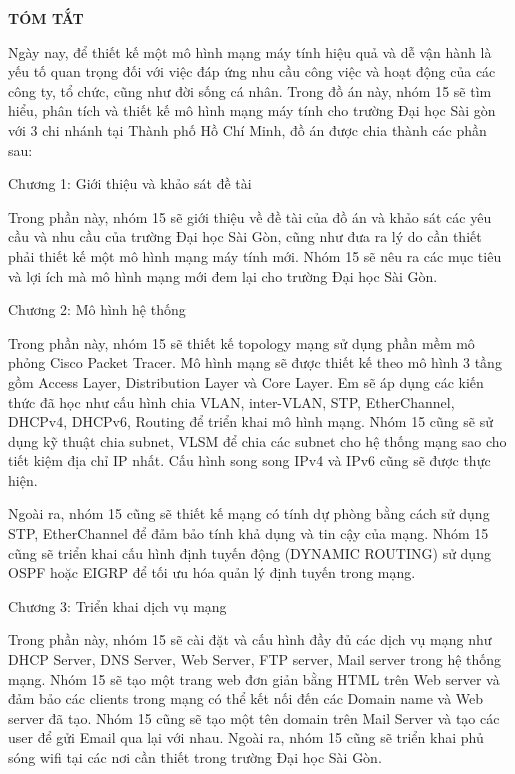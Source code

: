 \documentclass[12pt, a4paper]{article}
\begin{document}
	\newpage
	\begin{center}
		{\Large \textbf{TÓM TẮT}}\\ [15pt]
	\end{center}
	\par
	\large
	\hspace{0.75cm}Ngày nay, để thiết kế một mô hình mạng máy tính hiệu quả và dễ vận hành là yếu tố quan trọng đối với việc đáp ứng nhu cầu công việc và hoạt động của các công ty, tổ chức, cũng như đời sống cá nhân. Trong đồ án này, nhóm 15 sẽ tìm hiểu, phân tích và thiết kế mô hình mạng máy tính cho trường Đại học Sài gòn với 3 chi nhánh tại Thành phố Hồ Chí Minh, đồ án được chia thành các phần sau:\par
	\hspace{0.75cm}Chương 1: Giới thiệu và khảo sát đề tài\par
	\hspace{0.75cm}Trong phần này, nhóm 15 sẽ giới thiệu về đề tài của đồ án và khảo sát các yêu cầu và nhu cầu của trường Đại học Sài Gòn, cũng như đưa ra lý do cần thiết phải thiết kế một mô hình mạng máy tính mới. Nhóm 15 sẽ nêu ra các mục tiêu và lợi ích mà mô hình mạng mới đem lại cho trường Đại học Sài Gòn.\par
	\hspace{0.75cm}Chương 2: Mô hình hệ thống\par
	\hspace{0.75cm}Trong phần này, nhóm 15 sẽ thiết kế topology mạng sử dụng phần mềm mô phỏng Cisco Packet Tracer. Mô hình mạng sẽ được thiết kế theo mô hình 3 tầng gồm Access Layer, Distribution Layer và Core Layer. Em sẽ áp dụng các kiến thức đã học như cấu hình chia VLAN, inter-VLAN, STP, EtherChannel, DHCPv4, DHCPv6, Routing để triển khai mô hình mạng. Nhóm 15 cũng sẽ sử dụng kỹ thuật chia subnet, VLSM để chia các subnet cho hệ thống mạng sao cho tiết kiệm địa chỉ IP nhất. Cấu hình song song IPv4 và IPv6 cũng sẽ được thực hiện.\par
	\hspace{0.75cm}Ngoài ra, nhóm 15 cũng sẽ thiết kế mạng có tính dự phòng bằng cách sử dụng STP, EtherChannel để đảm bảo tính khả dụng và tin cậy của mạng. Nhóm 15 cũng sẽ triển khai cấu hình định tuyến động (DYNAMIC ROUTING) sử dụng OSPF hoặc EIGRP để tối ưu hóa quản lý định tuyến trong mạng. \par
	\hspace{0.75cm}Chương 3: Triển khai dịch vụ mạng 	
	\par
	\hspace{0.75cm}Trong phần này, nhóm 15 sẽ cài đặt và cấu hình đầy đủ các dịch vụ mạng như DHCP Server, DNS Server, Web Server, FTP server, Mail server trong hệ thống mạng. Nhóm 15 sẽ tạo một trang web đơn giản bằng HTML trên Web server và đảm bảo các clients trong mạng có thể kết nối đến các Domain name và Web server đã tạo. Nhóm 15 cũng sẽ tạo một tên domain trên Mail Server và tạo các user để gửi Email qua lại với nhau. Ngoài ra, nhóm 15 cũng sẽ triển khai phủ sóng wifi tại các nơi cần thiết trong trường Đại học Sài Gòn.\par
\end{document}
